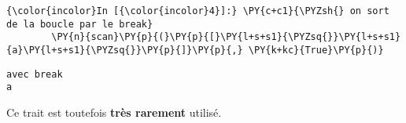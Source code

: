     \begin{Verbatim}[commandchars=\\\{\},frame=single,framerule=0.3mm,rulecolor=\color{cellframecolor}]
{\color{incolor}In [{\color{incolor}4}]:} \PY{c+c1}{\PYZsh{} on sort de la boucle par le break}
        \PY{n}{scan}\PY{p}{(}\PY{p}{[}\PY{l+s+s1}{\PYZsq{}}\PY{l+s+s1}{a}\PY{l+s+s1}{\PYZsq{}}\PY{p}{]}\PY{p}{,} \PY{k+kc}{True}\PY{p}{)}
\end{Verbatim}


    \begin{Verbatim}[commandchars=\\\{\},frame=single,framerule=0.3mm,rulecolor=\color{cellframecolor}]
avec break
a
\end{Verbatim}

    Ce trait est toutefois \textbf{très rarement} utilisé.


    
    
    
